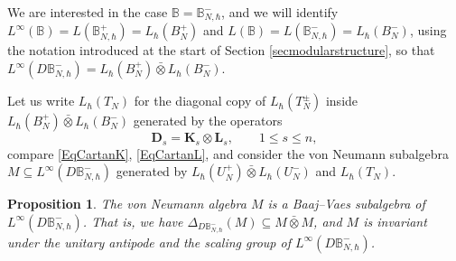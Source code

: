 \documentclass[11pt, reqno]{amsart}
\newtheorem{prop}[theorem]{Proposition}
\theoremstyle{definition}
\numberwithin{equation}{section}
\newcommand{\Nilp}{U}
\newcommand{\Bor}{B}
\newcommand{\Tor}{T}
\newcommand{\Kb}{\mathbf{K}}
\newcommand{\Lb}{\mathbf{L}}
\newcommand{\Db}{\mathbf{D}}
\newcommand{\Bbbb}{\mathbb{B}}
\begin{document}
We are interested in the case $ \Bbbb = \Bbbb_{N, \hbar}^- $, and we will identify $ L^\infty(\Bbbb) = L(\Bbbb_{N, \hbar}^+) = L_\hbar(\Bor_N^+) $ and $ L(\Bbbb) = L(\Bbbb_{N, \hbar}^-) = L_\hbar(\Bor_N^-) $, using the notation introduced at the start of Section \ref{secmodularstructure}, so that $ L^\infty(D \Bbbb_{N, \hbar}^-) = L_\hbar(\Bor_N^+) \bar{\otimes} L_\hbar(\Bor_N^-) $.

Let us write $ L_\hbar(\Tor_N) $ for the diagonal copy of $ L_\hbar(\Tor_N^\pm) $ inside $ L_\hbar(\Bor_N^+) \bar{\otimes} L_\hbar(\Bor_N^-)$ generated by the operators
\[
\Db_s = \Kb_s \otimes \Lb_s,\qquad 1 \leq s \leq n,
\]
compare \eqref{EqCartanK}, \eqref{EqCartanL}, and consider the von Neumann subalgebra $ M \subseteq L^\infty(D \Bbbb_{N, \hbar}^-) $ generated by $ L_\hbar(\Nilp_N^+) \bar{\otimes} L_\hbar(\Nilp_N^-) $ and $ L_\hbar(\Tor_N) $. 

\begin{prop}
The von Neumann algebra $ M $ is a Baaj--Vaes subalgebra of $ L^\infty(D \Bbbb_{N, \hbar}^-) $. That is, we have $ \Delta_{D \Bbbb_{N, \hbar}^-}(M) \subseteq M \bar{\otimes} M $, and $ M $ is invariant under the unitary antipode and the scaling group of $ L^\infty(D \Bbbb_{N, \hbar}^-) $. 
\end{prop}
\end{document}
